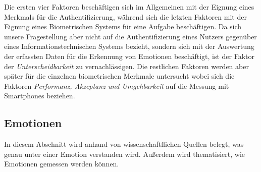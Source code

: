 Die ersten vier Faktoren beschäftigen sich im Allgemeinen mit der Eignung eines Merkmals für die Authentifizierung, während sich die letzten Faktoren mit der Eignung eines Biometrischen Systems für eine Aufgabe beschäftigen. Da sich unsere Fragestellung aber nicht auf die Authentifizierung eines Nutzers gegenüber eines Informationstechnischen Systems bezieht, sondern sich mit der Auswertung der erfassten Daten für die Erkennung von Emotionen beschäftigt, ist der Faktor der \textit{Unterscheidbarkeit} zu vernachlässigen. Die restlichen Faktoren werden aber später für die einzelnen biometrischen Merkmale untersucht wobei sich die Faktoren \textit{Performanz, Akzeptanz und Umgehbarkeit} auf die Messung mit Smartphones beziehen.
\subsection{Emotionen}
In diesem Abschnitt wird anhand von wissenschaftflichen Quellen belegt, was genau unter einer Emotion verstanden wird. Außerdem wird thematisiert, wie Emotionen gemessen werden können.
